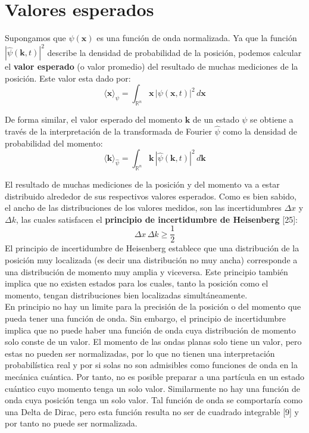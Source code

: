 \documentclass[12pt]{book}
\numberwithin{equation}{chapter}
\def\R{\mathbb{R}}
\def\la{\langle}
\def\ra{\rangle}
\def\x{\mathbf{x}}
\def\k{\mathbf{k}}
\begin{document}
\section{Valores esperados}
Supongamos que $\psi(\x)$ es una funci\'on de onda normalizada. Ya que la funci\'on $|\hat{\psi}(\k , t)|^{2}$ describe la densidad de probabilidad de la posici\'on, podemos calcular el {\bf valor esperado} (o valor promedio) del resultado de muchas mediciones de la posici\'on. Este valor esta dado por:
\begin{equation}\label{pos-ve}
\la \x \ra_{\psi}= \int_{\R^{n}} \x \, |\psi(\x , t)|^{2} \, d\x
\end{equation}

De forma similar, el valor esperado del momento $\k$ de un estado $\psi$ se obtiene a trav\'es de la interpretaci\'on de la transformada de Fourier $\hat{\psi}$ como la densidad de probabilidad del momento:
\begin{equation}\label{mon-ve}
\la \k \ra_{\hat{\psi}}= \int_{\R^{n}} \k \, | \hat{\psi}(\k,t) |^{2}\, d\k
\end{equation}

El resultado de muchas mediciones de la posici\'on y del momento va a estar distribuido alrededor de sus respectivos valores esperados. Como es bien sabido, el ancho de las distribuciones de los valores medidos, son las incertidumbres $\Delta x$ y $\Delta k$, las cuales satisfacen el {\bf principio de incertidumbre de Heisenberg} [25]:
\begin{equation}\label{piH}
\Delta x \, \Delta k \geq \frac{1}{2}
\end{equation}
El principio de incertidumbre de Heisenberg establece que una distribuci\'on de la posici\'on muy localizada (es decir una distribuci\'on no muy ancha) corresponde a una distribuci\'on de momento muy amplia y viceversa. Este principio tambi\'en implica que no existen estados para los cuales, tanto la posici\'on como el momento, tengan distribuciones bien localizadas simult\'aneamente. \\

En principio no hay un limite para la precisi\'on de la posici\'on o del momento que pueda tener una funci\'on de onda. Sin embargo, el principio de incertidumbre implica que no puede haber una funci\'on de onda cuya distribuci\'on de momento solo conste de un valor. El momento de las ondas planas solo tiene un valor, pero estas no pueden ser normalizadas, por lo que no tienen una interpretaci\'on probabil\'istica real y por si solas no son admisibles como funciones de onda en la mec\'anica cu\'antica. Por tanto, no es posible preparar a una part\'icula en un estado cu\'antico cuyo momento tenga un solo valor. Similarmente no hay una funci\'on de onda cuya posici\'on tenga un solo valor. Tal funci\'on de onda se comportar\'ia como una Delta de Dirac, pero esta funci\'on resulta no ser de cuadrado integrable [9] y por tanto no puede ser normalizada.
\end{document}
